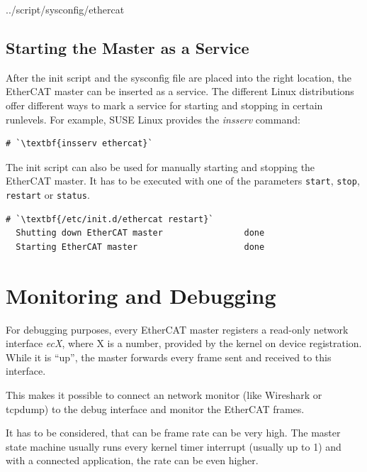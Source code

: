 \documentclass[a4paper,12pt,BCOR6mm,bibtotoc,idxtotoc]{scrbook}
\begin{document}

    {../script/sysconfig/ethercat}

\subsection{Starting the Master as a Service}
\label{sec:service}

After the init script and the sysconfig file are placed into the right
location, the EtherCAT master can be inserted as a service. The different Linux
distributions offer different ways to mark a service for starting and stopping
in certain runlevels. For example, SUSE Linux provides the \textit{insserv}
command:

\begin{lstlisting}
# `\textbf{insserv ethercat}`
\end{lstlisting}

The init script can also be used for manually starting and stopping
the EtherCAT master. It has to be executed with one of the parameters
\texttt{start}, \texttt{stop}, \texttt{restart} or \texttt{status}.

\begin{lstlisting}[gobble=2]
  # `\textbf{/etc/init.d/ethercat restart}`
  Shutting down EtherCAT master                done
  Starting EtherCAT master                     done
\end{lstlisting}


\section{Monitoring and Debugging}
\label{sec:debug}


For debugging purposes, every EtherCAT master registers a read-only network
interface \textit{ecX}, where X is a number, provided by the kernel on device
registration. While it is ``up'', the master forwards every frame sent and
received to this interface.

This makes it possible to connect an network monitor (like Wireshark or
tcpdump) to the debug interface and monitor the EtherCAT frames.

It has to be considered, that can be frame rate can be very high. The master
state machine usually runs every kernel timer interrupt (usually up to
\unit{1}{\kilo\hertz}) and with a connected application, the rate can be even
higher.
\end{document}
